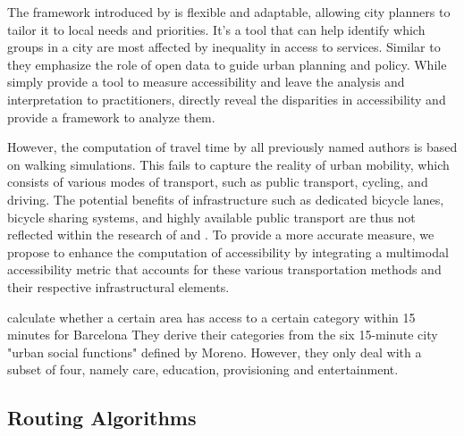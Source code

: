 The framework introduced by \cite{nicolettiDisadvantagedCommunitiesHave2023} is flexible and adaptable, allowing city planners to tailor it to local needs and priorities. 
It's a tool that can help identify which groups in a city are most affected by inequality in access to services. 
Similar to \cite{olivariAreItalianCities2023} they emphasize the role of open data to guide urban planning and policy.
While \cite{olivariAreItalianCities2023} simply provide a tool to measure accessibility and leave the analysis and interpretation to practitioners, \cite{nicolettiDisadvantagedCommunitiesHave2023} directly reveal the disparities in accessibility and provide a framework to analyze them.

However, the computation of travel time by all previously named authors is based on walking simulations. 
This fails to capture the reality of urban mobility, which consists of various modes of transport, such as public transport, cycling, and driving.
The potential benefits of infrastructure such as dedicated bicycle lanes, bicycle sharing systems, and highly available public transport are thus not reflected within the research of \cite{olivariAreItalianCities2023} and \cite{nicolettiDisadvantagedCommunitiesHave2023}.
To provide a more accurate measure, we propose to enhance the computation of accessibility by integrating a multimodal accessibility metric that accounts for these various transportation methods and their respective infrastructural elements.

\cite{ferrer-ortizBarcelona15MinuteCity2022} calculate whether a certain area has access to a certain category within 15 minutes for Barcelona
They derive their categories from the six 15-minute city "urban social functions" defined by Moreno.
However, they only deal with a subset of four, namely care, education, provisioning and entertainment.

%
\subsection{Routing Algorithms}
\label{subsec:routing_algorithms}

